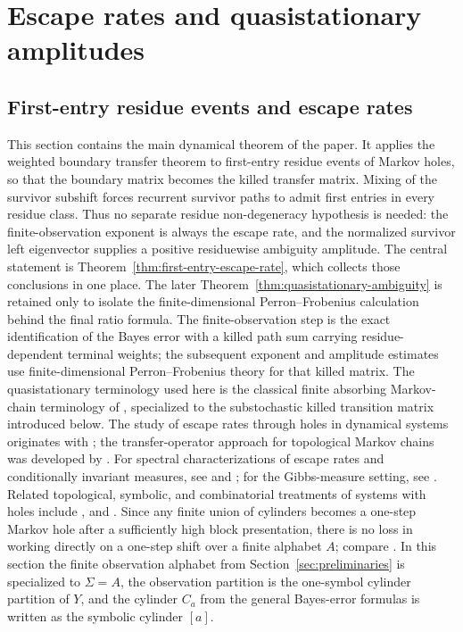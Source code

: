 \section{Escape rates and quasistationary amplitudes}
\label{sec:open-system}

\subsection{First-entry residue events and escape rates}

This section contains the main dynamical theorem of the paper.  It
applies the weighted boundary transfer theorem to first-entry residue
events of Markov holes, so that the boundary matrix becomes the killed
transfer matrix.  Mixing of the survivor subshift forces recurrent
survivor paths to admit first entries in every residue class.  Thus no
separate residue non-degeneracy hypothesis is needed: the
finite-observation exponent is always the escape rate, and the
normalized survivor left eigenvector supplies a positive residuewise
ambiguity amplitude.  The central statement is
Theorem~\ref{thm:first-entry-escape-rate}, which collects those
conclusions in one place.  The later
Theorem~\ref{thm:quasistationary-ambiguity} is retained only to isolate
the finite-dimensional Perron--Frobenius calculation behind the final
ratio formula.  The finite-observation step is the exact identification
of the Bayes error with a killed path sum carrying residue-dependent
terminal weights; the subsequent exponent and amplitude estimates use
finite-dimensional Perron--Frobenius theory for that killed matrix.  The
quasistationary terminology used here is the classical finite absorbing
Markov-chain terminology of \citet{DarrochSeneta1965}, specialized to the
substochastic killed transition matrix introduced below.  The study of
escape rates through holes in dynamical systems
originates with
\citet{PianigianiYorke1979}; the transfer-operator approach for
topological Markov chains was developed by
\citet{ColletMartinezSchmitt1997}.  For spectral characterizations of
escape rates and conditionally invariant measures, see
\citet{DemersYoung2006,FroylandStancevic2010,DemersWrightYoung2012} and
\citet{KellerLiverani2009}; for the Gibbs-measure setting, see
\citet{FergusonPollicott2012}.  Related topological, symbolic, and
combinatorial treatments of systems with holes include
\citet{BundfussKrugerTroubetzkoy2011},
\citet{CheriyathAgarwal2023,BonannoCristadoroLenci2022} and
\citet{AgarwalCheriyathTikekar2024}.  Since any finite union of
cylinders becomes a one-step Markov hole after a sufficiently high block
presentation, there is no loss in working directly on a one-step shift
over a finite alphabet \(A\); compare \citet{LindMarcus1995,Bowen2008}.
In this section the finite observation alphabet from
Section~\ref{sec:preliminaries} is specialized to \(\Sigma=A\), the
observation partition is the one-symbol cylinder partition of \(Y\), and
the cylinder \(C_a\) from the general Bayes-error formulas is written as
the symbolic cylinder \([a]\).

